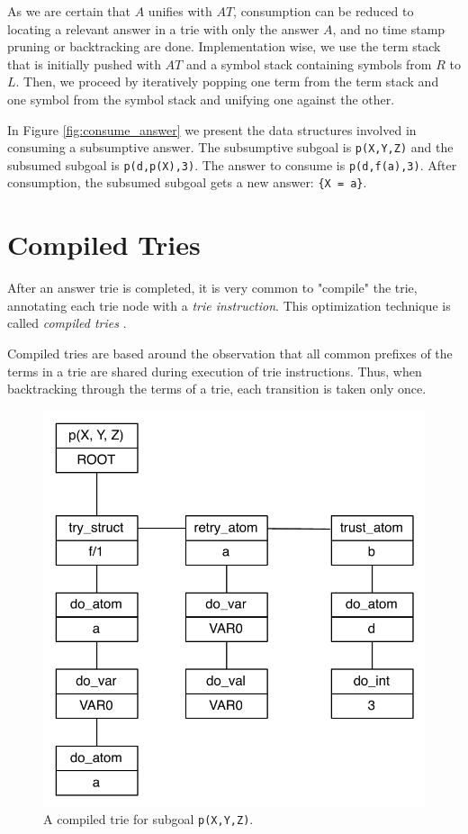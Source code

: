 As we are certain that $A$ unifies with $AT$, consumption can be reduced to locating a relevant
answer in a trie with only the answer $A$, and no time stamp pruning or backtracking are done.
Implementation wise, we use the term stack that is initially pushed with $AT$
and a symbol stack containing symbols from $R$ to $L$. Then, we proceed by
iteratively popping one term from the term stack and one symbol from the symbol stack
and unifying one against the other.

In Figure \ref{fig:consume_answer} we present the data structures involved in consuming
a subsumptive answer. The subsumptive subgoal is \texttt{p(X,Y,Z)} and the
subsumed subgoal is \texttt{p(d,p(X),3)}. The answer to consume is \texttt{p(d,f(a),3)}.
After consumption, the subsumed subgoal gets a new answer: \texttt{\{X~=~a\}}.

\section{Compiled Tries}\label{sec:compiled_tries}

After an answer trie is completed, it is very common to "compile" the trie,
annotating each trie node with a \textit{trie instruction}. This optimization technique
is called \textit{compiled tries} \cite{RamakrishnanIV-99}.

Compiled tries are based around the observation that all common prefixes of the terms in a trie
are shared during execution of trie instructions. Thus, when backtracking
through the terms of a trie, each transition is taken only once.

\begin{figure}[H]
  \centering
    \includegraphics[scale=0.6]{compiled_trie.pdf}
  \caption{A compiled trie for subgoal \texttt{p(X,Y,Z)}.}
  \label{fig:compiled_trie}
\end{figure}

